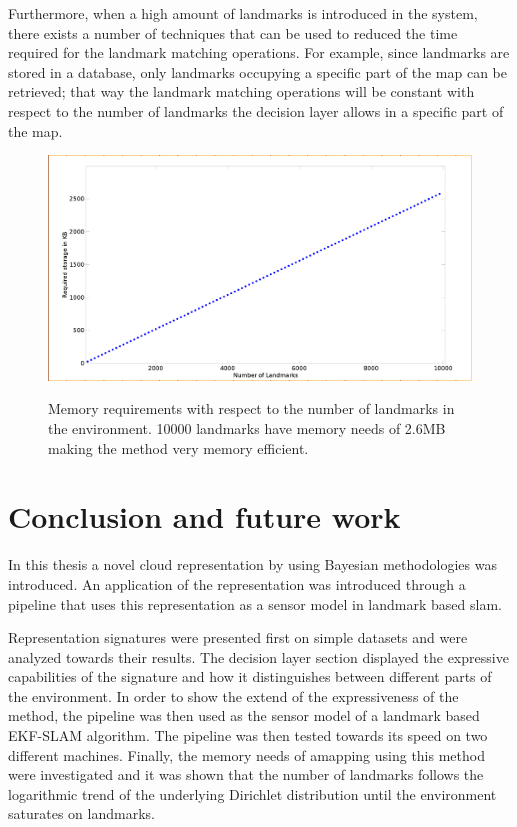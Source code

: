 \documentclass[twoside,hidelinks]{article}
\begin{document}
Furthermore, when a high amount of  landmarks is introduced in the system, there exists a number of techniques that can be used to reduced the time required for the landmark matching operations.
For example, since landmarks are stored in a database, only landmarks occupying a specific part of the map can be retrieved;
that way the landmark matching operations will be constant with respect to the number of landmarks the decision layer allows in a specific part of the map. 

\begin{figure}[!ht]
  \centering
  \includegraphics[width=.8\textwidth]{MemoryRequirements} \\
  \caption{Memory requirements with respect to the number of landmarks in the environment. 10000 landmarks have memory needs of 2.6MB making the method very memory efficient.}
  \label{pip:reqs}
\end{figure}


\newpage
\section{Conclusion and future work}
\label{sec:conclusion}

In this thesis a novel cloud representation by using Bayesian methodologies was introduced.
An application of the representation was introduced through a pipeline that uses this representation as a sensor model in landmark based slam. 

Representation signatures were presented first on simple datasets and were analyzed towards their results. 
The decision layer section displayed the expressive capabilities of the signature and how it distinguishes between different parts of the environment.
In order to show the extend of the expressiveness of the method, the pipeline was then used as the sensor model of a landmark based EKF-SLAM algorithm.
The pipeline was then tested towards its speed on two different machines.
Finally, the memory needs of amapping using this method were investigated and it was shown that the number of landmarks follows the logarithmic trend of the underlying Dirichlet distribution until the environment saturates on landmarks.
\end{document}
